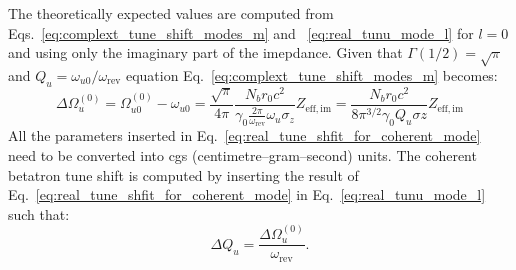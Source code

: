 The theoretically expected values are computed from Eqs.~\eqref{eq:complext_tune_shift_modes_m} and ~\eqref{eq:real_tunu_mode_l} for $l=0$ and using only the imaginary part of the imepdance. Given that $\Gamma(1/2)=\sqrt{\pi}$ and $Q_u = \omega_{u0}/\omega_\mathrm{rev}$ equation Eq.~\eqref{eq:complext_tune_shift_modes_m} becomes:
\begin{equation}\label{eq:real_tune_shfit_for_coherent_mode}
    \Delta \Omega_u^{(0)} =  \Omega_{u0}^{(0)} - \omega_{u0} = \frac{\sqrt{\pi}}{4 \pi}\frac{N_b r_0 c^2}{\gamma_0 \frac{2\pi}{\omega_\mathrm{rev}}\omega_u \sigma_z} Z_\mathrm{eff, im} = \frac{N_b r_0 c^2}{8 \pi^{3/2} \gamma_0 Q_u \sigma z}Z_\mathrm{eff, im}
\end{equation}
All the parameters inserted in Eq.~\eqref{eq:real_tune_shfit_for_coherent_mode} need to be converted into cgs (centimetre–gram–second) units. The coherent betatron tune shift is computed by inserting the result of Eq.~\eqref{eq:real_tune_shfit_for_coherent_mode} in Eq.~\eqref{eq:real_tunu_mode_l} such that: 
\begin{equation}
    \Delta Q_u = \frac{\Delta \Omega_u^{(0)}}{\omega_\mathrm{rev}}.
\end{equation}



